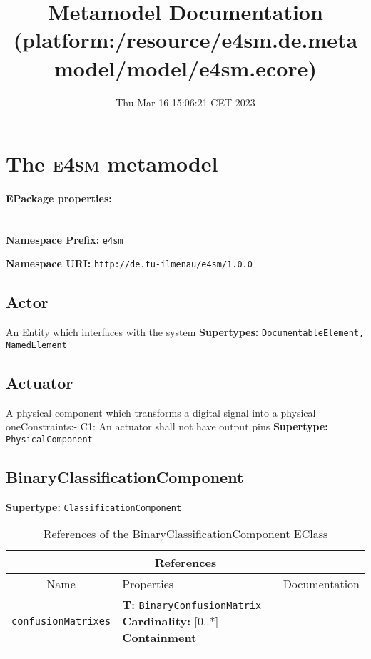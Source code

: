 \documentclass{article}
\title{Metamodel Documentation (platform:/resource/e4sm.de.metamodel/model/e4sm.ecore)}
\date{Thu Mar 16 15:06:21 CET 2023}
\author{}
\begin{document}
\section[e4sm]{The \textsc{e4sm} metamodel}
\label{e4sm}

\paragraph{EPackage properties:} \hspace{0pt} \\ \indent
\textbf{Namespace Prefix:} \texttt{e4sm}

\textbf{Namespace URI:} \texttt{http://de.tu-ilmenau/e4sm/1.0.0}
\subsection[Actor]{Actor}
\label{e4smActor}

An Entity which interfaces with the system
\textbf{Supertypes: }\texttt{DocumentableElement, NamedElement}
\subsection[Actuator]{Actuator}
\label{e4smActuator}

A physical component which transforms a digital signal into a physical oneConstraints:- C1: An actuator shall not have output pins
\textbf{Supertype: }\texttt{PhysicalComponent}
\subsection[BinaryClassificationComponent]{BinaryClassificationComponent}
\label{e4smBinaryClassificationComponent}

\textbf{Supertype: }\texttt{ClassificationComponent}
\begin{table}[H]
\footnotesize
\begin{tabularx}{\textwidth}{|c| p{4 cm} | X |}
\hline
\multicolumn{3}{|c|}{\textbf{References}} \\
\hline
Name & Properties & Documentation \\ \hline \hline
\texttt{confusionMatrixes}
 & 
\textbf{T:} \texttt{BinaryConfusionMatrix}
\newline
\textbf{Cardinality:} [0..*]
\newline
\textbf{Containment}
 & \\ \hline
\caption{References of the BinaryClassificationComponent EClass}
\end{tabularx}
\label{e4smBinaryClassificationComponentref}
\end{table}
\end{document}
